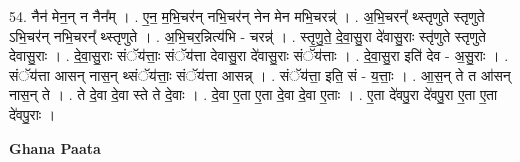 \documentclass[17pt]{extarticle}
\begin{document}
54. नैन॑ मेन॒न् न नैन᳚म् । . ए॒न॒ म॒भि॒चर॑न् नभि॒चर॑न् नेन मेन मभि॒चरन्न्॑ । . अ॒भि॒चरन्᳚ थ्स्तृणुते स्तृणुते ऽभि॒चर॑न् नभि॒चरन्᳚ थ्स्तृणुते । . अ॒भि॒चर॒न्नित्य॑भि - चरन्न्॑ । . स्तृ॒णु॒ते॒ दे॒वा॒सु॒रा दे॑वासु॒राः स्तृ॑णुते स्तृणुते देवासु॒राः । . दे॒वा॒सु॒राः संॅय॑त्ताः॒ संॅय॑त्ता देवासु॒रा दे॑वासु॒राः संॅय॑त्ताः । . दे॒वा॒सु॒रा इति॑ देव - अ॒सु॒राः । . संॅय॑त्ता आसन् नास॒न् थ्संॅय॑त्ताः॒ संॅय॑त्ता आसन्न् । . संॅय॑त्ता॒ इति॒ सं - य॒त्ताः॒ । . आ॒स॒न् ते त आ॑सन् नास॒न् ते । . ते दे॒वा दे॒वा स्ते ते दे॒वाः । . दे॒वा ए॒ता ए॒ता दे॒वा दे॒वा ए॒ताः । . ए॒ता दे॑वपु॒रा दे॑वपु॒रा ए॒ता ए॒ता दे॑वपु॒राः । \newline

\textbf{Ghana Paata } \newline
\end{document}
